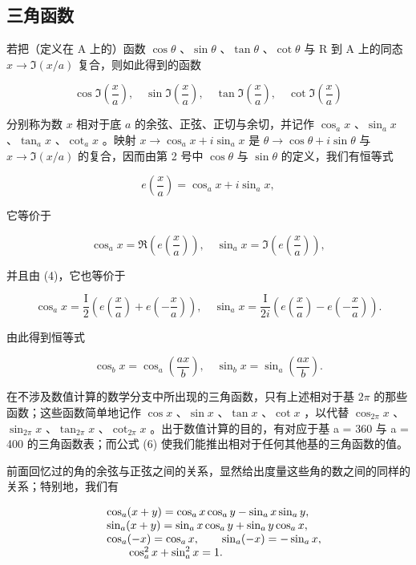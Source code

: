\subsection{三角函数}

若把（定义在 A 上的）函数 \(\cos\theta\) 、\(\sin\theta\) 、\(\tan\theta\) 、\(\cot\theta\) 与 R 到 A 上的同态 \(x\to\Im(x/a)\) 复合，则如此得到的函数

\[
\cos \Im \left(\frac {x}{a}\right), \quad \sin \Im \left(\frac {x}{a}\right), \quad \tan \Im \left(\frac {x}{a}\right), \quad \cot \Im \left(\frac {x}{a}\right)
\]

分别称为数 \(x\) 相对于底 \(a\) 的余弦、正弦、正切与余切，并记作 \(\cos_a x\) 、\(\sin_a x\) 、\(\tan_a x\) 、\(\cot_a x\) 。映射 \(x \to \cos_a x + i \sin_a x\) 是 \(\theta \to \cos \theta + i \sin \theta\) 与 \(x \to \Im(x/a)\) 的复合，因而由第 2 号中 \(\cos \theta\) 与 \(\sin \theta\) 的定义，我们有恒等式

\[
e \left(\frac {x}{a}\right) = \cos_ {a} x + i \sin_ {a} x,\tag{5}
\]

它等价于

\[
\cos_ {a} x = \Re \left(e \left(\frac {x}{a}\right)\right), \quad \sin_ {a} x = \Im \left(e \left(\frac {x}{a}\right)\right),
\]

并且由 (4)，它也等价于

\[
\cos_ {a} x = \frac {\mathrm{I}}{2} \left(e \left(\frac {x}{a}\right) + e \left(- \frac {x}{a}\right)\right), \quad \sin_ {a} x = \frac {\mathrm{I}}{2 i} \left(e \left(\frac {x}{a}\right) - e \left(- \frac {x}{a}\right)\right).
\]

由此得到恒等式

\[
\cos_ {b} x = \cos_ {a} \left(\frac {a x}{b}\right), \quad \sin_ {b} x = \sin_ {a} \left(\frac {a x}{b}\right).\tag{6}
\]

在不涉及数值计算的数学分支中所出现的三角函数，只有上述相对于基 \(2\pi\) 的那些函数；这些函数简单地记作 \(\cos x\) 、\(\sin x\) 、\(\tan x\) 、\(\cot x\) ，以代替 \(\cos_{2\pi}x\) 、\(\sin_{2\pi}x\) 、\(\tan_{2\pi}x\) 、\(\cot_{2\pi}x\) 。出于数值计算的目的，有对应于基 a = 360 与 a = 400 的三角函数表；而公式 (6) 使我们能推出相对于任何其他基的三角函数的值。

前面回忆过的角的余弦与正弦之间的关系，显然给出度量这些角的数之间的同样的关系；特别地，我们有

\[
\begin{array}{r l} & {\cos_ {a} (x + y) = \cos_ {a} x \cos_ {a} y - \sin_ {a} x \sin_ {a} y,} \\ & {\sin_ {a} (x + y) = \sin_ {a} x \cos_ {a} y + \sin_ {a} y \cos_ {a} x,} \\ & {\cos_ {a} (- x) = \cos_ {a} x, \qquad \sin_ {a} (- x) = - \sin_ {a} x,} \\ & {\qquad \cos_ {a} ^ {2} x + \sin_ {a} ^ {2} x = 1.} \end{array}
\]

